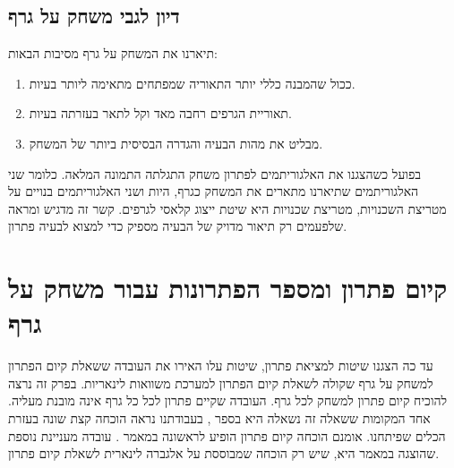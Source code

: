 \documentclass[12pt,leqno]{article}
\theoremstyle{theoremdd}
\begin{document}
\subsection{דיון לגבי משחק על גרף}
תיארנו את המשחק על גרף 
מסיבות הבאות:
\begin{enumerate}
    \item 
    ככול שהמבנה כללי יותר התאוריה שמפתחים מתאימה ליותר בעיות.
    \item 
    תאוריית הגרפים רחבה מאד וקל לתאר בעזרתה בעיות.
    \item 
    מבליט את מהות הבעיה והגדרה הבסיסית ביותר של המשחק.
\end{enumerate}
בפועל כשהצגנו את האלגוריתמים לפתרון משחק 
התגלתה התמונה המלאה.
כלומר
שני האלגוריתמים שתיארנו מתארים את המשחק כגרף,
היות ושני האלגוריתמים בנויים על מטריצת השכנויות,
מטריצת שכנויות היא שיטת ייצוג קלאסי לגרפים.
קשר זה מדגיש ומראה שלפעמים רק תיאור מדויק של הבעיה מספיק כדי למצוא לבעיה פתרון.

\section{קיום פתרון ומספר הפתרונות עבור משחק על גרף}
עד כה הצגנו שיטות למציאת פתרון,
שיטות עלו האירו את העובדה
ששאלת קיום הפתרון למשחק על גרף שקולה לשאלת קיום הפתרון למערכת
משוואות לינאריות.
בפרק זה נרצה להוכיח קיום פתרון למשחק לכל גרף.
העובדה שקיים פתרון לכל כל גרף אינה מובנת מעליה.
אחד המקומות ששאלה זה נשאלה היא בספר 
\cite{B3},
בעבודתנו נראה הוכחה קצת שונה בעזרת הכלים שפיתחנו.
אומנם הוכחה קיום פתרון הופיע לראשונה במאמר 
\cite{Sutner}.
עובדה מעניינת נוספת שהוצגה במאמר היא,
שיש רק הוכחה שמבוססת על אלגברה לינארית
לשאלת קיום פתרון.
\end{document}
